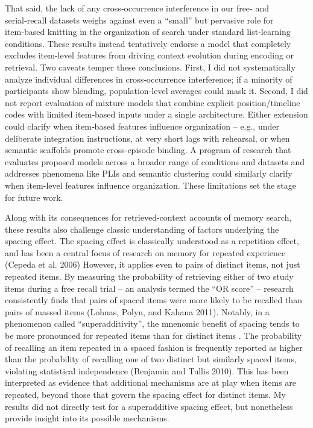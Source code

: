 \documentclass[
  letterpaper,
  11pt,
  english,
  singlespacing,
  headsepline]{MastersDoctoralThesis}
\begin{document}
That said, the lack of any cross‑occurrence interference in our free‑
and serial‑recall datasets weighs against even a ``small'' but pervasive
role for item‑based knitting in the organization of search under
standard list‑learning conditions. These results instead tentatively
endorse a model that completely excludes item-level features from
driving context evolution during encoding or retrieval. Two caveats
temper these conclusions. First, I did not systematically analyze
individual differences in cross‑occurrence interference; if a minority
of participants show blending, population‑level averages could mask it.
Second, I did not report evaluation of mixture models that combine
explicit position/timeline codes with limited item‑based inputs under a
single architecture. Either extension could clarify when item‑based
features influence organization -- e.g., under deliberate integration
instructions, at very short lags with rehearsal, or when semantic
scaffolds promote cross‑episode binding. A program of research that
evaluates proposed models across a broader range of conditions and
datasets and addresses phenomena like PLIs and semantic clustering could
similarly clarify when item-level features influence organization. These
limitations set the stage for future work.

Along with its consequences for retrieved-context accounts of memory
search, these results also challenge classic understanding of factors
underlying the spacing effect. The spacing effect is classically
understood as a repetition effect, and has been a central focus of
research on memory for repeated experience (Cepeda et al. 2006) However,
it applies even to pairs of distinct items, not just repeated items. By
measuring the probability of retrieving either of two study items during
a free recall trial -- an analysis termed the ``OR score'' -- research
consistently finds that pairs of spaced items were more likely to be
recalled than pairs of massed items (Lohnas, Polyn, and Kahana 2011).
Notably, in a phenomenon called ``superadditivity'', the mnenomic
benefit of spacing tends to be more pronounced for repeated items than
for distinct items . The probability of recalling an item repeated in a
spaced fashion is frequently reported as higher than the probability of
recalling one of two distinct but similarly spaced items, violating
statistical independence (Benjamin and Tullis 2010). This has been
interpreted as evidence that additional mechanisms are at play when
items are repeated, beyond those that govern the spacing effect for
distinct items. My results did not directly test for a superadditive
spacing effect, but nonetheless provide insight into its possible
mechanisms.
\end{document}
